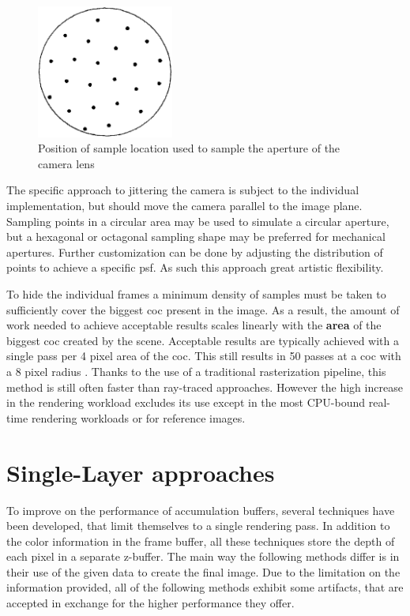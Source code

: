 \begin{figure}
\begin{center}
    \includegraphics[width=0.4\textwidth]{images/sample-locations.png}
\end{center}
\caption{Position of sample location used to sample the aperture of the camera lens \cite{Haeberli.1990}}
\label{fig:sample-pos}
\end{figure}

The specific approach to jittering the camera is subject to the individual implementation, but should move the camera parallel to the image plane.
Sampling points in a circular area may be used to simulate a circular aperture, but a hexagonal or octagonal sampling shape may be preferred for mechanical apertures.
Further customization can be done by adjusting the distribution of points to achieve a specific \gls{psf}.
As such this approach great artistic flexibility.

To hide the individual frames a minimum density of samples must be taken to sufficiently cover the biggest \gls{coc} present in the image.
As a result, the amount of work needed to achieve acceptable results scales linearly with the \textbf{area} of the biggest \gls{coc} created by the scene.
Acceptable results are typically achieved with a single pass per 4 pixel area of the \gls{coc}.
This still results in 50 passes at a \gls{coc} with a 8 pixel radius \cite{Demers.2005}.
Thanks to the use of a traditional rasterization pipeline, this method is still often faster than ray-traced approaches.
However the high increase in the rendering workload excludes its use except in the most CPU-bound real-time rendering workloads or for reference images.

\section{Single-Layer approaches}
To improve on the performance of accumulation buffers, several techniques have been developed, that limit themselves to a single rendering pass.
In addition to the color information in the frame buffer, all these techniques store the depth of each pixel in a separate z-buffer.
The main way the following methods differ is in their use of the given data to create the final image.
Due to the limitation on the information provided, all of the following methods exhibit some artifacts, that are accepted in exchange for the higher performance they offer.

